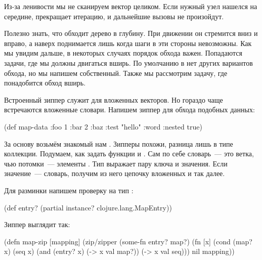 Из-за ленивости мы не сканируем вектор целиком. Если нужный узел нашелся на
середине,  прекращает итерацию, и дальнейшие вызовы  не
произойдут.

Полезно знать, что  обходит дерево в глубину. При движении он
стремится вниз и вправо, а наверх поднимается лишь когда шаги в эти стороны
невозможны. Как мы увидим дальше, в некоторых случаях порядок обхода
важен. Попадаются задачи, где мы должны двигаться вширь. По умолчанию в
 нет других вариантов обхода, но мы напишем собственный. Также мы
рассмотрим задачу, где понадобится обход вширь.

Встроенный зиппер  служит для вложенных векторов. Но гораздо чаще
встречаются вложенные словари. Напишем зиппер для обхода подобных данных:

\begin{english}
  \begin{clojure}
(def map-data
  {:foo 1
   :bar 2
   :baz {:test "hello"
         :word {:nested true}}})
  \end{clojure}
\end{english}

За основу возьмём знакомый нам . Зипперы похожи, разница лишь в типе
коллекции. Подумаем, как задать функции  и . Сам по себе
словарь~--- это ветка, чью потомки~--- элементы . Тип  выражает
пару ключа и значения. Если значение~--- словарь, получим из него цепочку
вложенных  и так далее.

Для разминки напишем проверку на тип :

\begin{english}
  \begin{clojure}
(def entry?
  (partial instance? clojure.lang.MapEntry))
  \end{clojure}
\end{english}

Зиппер  выглядит так:

\begin{english}
  \begin{clojure}
(defn map-zip [mapping]
  (zip/zipper
   (some-fn entry? map?)
   (fn [x]
     (cond
       (map? x)
       (seq x)
       (and (entry? x) (-> x val map?))
       (-> x val seq)))
   nil
   mapping))
  \end{clojure}
\end{english}

